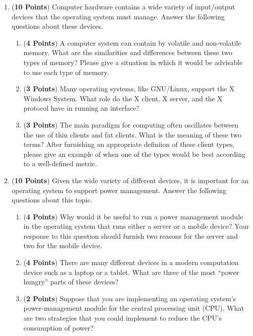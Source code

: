 \documentclass[12pt,epsf,psfig,graphics]{article}
\begin{document}
\begin{enumerate}
\item ({\bf 10 Points}) Computer hardware contains a wide variety of input/output devices that the operating system must
  manage.  Answer the following questions about these devices.

  \begin{enumerate}

    \item ({\bf 4 Points}) A computer system can contain by volatile and non-volatile memory.  What are the similarities
      and differences between these two types of memory?  Please give a situation in which it would be advisable to use
      each type of memory.

    \item ({\bf 3 Points}) Many operating systems, like GNU/Linux, support the X Windows System.  What role do the X
      client, X server, and the X protocol have in running an interface?

    \item ({\bf 3 Points}) The main paradigm for computing often oscillates between the use of thin clients and fat
      clients.  What is the meaning of these two terms?  After furnishing an appropriate definiion of these client
      types, please give an example of when one of the types would be best according to a well-defined metric.

  \end{enumerate}

  \newpage

\item ({\bf 10 Points}) Given the wide variety of different devices, it is important for an operating system to support
  power management.  Answer the following questions about this topic.

  \begin{enumerate}

    \item ({\bf 4 Points}) Why would it be useful to run a power management module in the operating system that runs
      either a server or a mobile device? Your response to this question should furnish two reasons for the server and
      two for the mobile device.

    \item ({\bf 4 Points}) There are many different devices in a modern computation device such as a laptop or a tablet.
      What are three of the most ``power hungry'' parts of these devices? 

    \item ({\bf 2 Points}) Suppose that you are implementing an operating system's power-management module for the
      central processing unit (CPU).  What are two strategies that you could implement to reduce the CPU's consumption
      of power?


\end{enumerate}
\end{enumerate}
\end{document}

